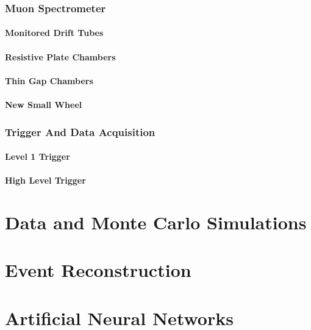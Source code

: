 \documentclass{umassthesis}          %
\begin{document}
\subsection{Muon Spectrometer}\label{sec:atlas_muon}

\subsubsection{Monitored Drift Tubes}\label{sec:atlas_mdt}

\subsubsection{Resistive Plate Chambers}\label{sec:atlas_rpc}

\subsubsection{Thin Gap Chambers}\label{sec:atlas_tgc}

\subsubsection{New Small Wheel}\label{sec:atlas_nsw}


\subsection{Trigger And Data Acquisition}\label{sec:atlas_trigger}
\subsubsection{Level 1 Trigger}\label{sec:atlas_l1_trigger}

\subsubsection{High Level Trigger}\label{sec:atlas_hlt}


\chapter{Data and Monte Carlo Simulations}\label{ch:data_mc}

\chapter{Event Reconstruction}\label{ch:reco}

\chapter{Artificial Neural Networks}\label{ch:nn}
\end{document}
